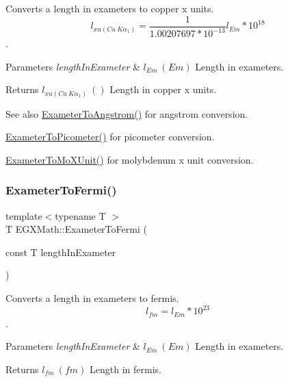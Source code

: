 Converts a length in exameters to copper x units. \[ l_{xu(Cu\ K\alpha_1)}= \frac{1}{1.00207697*10^{-13}} l_{Em} * 10^{18}\]. 


\begin{DoxyParams}{Parameters}
{\em length\+In\+Exameter} & $ l_{Em}\ (Em)$ Length in exameters. \\
\hline
\end{DoxyParams}
\begin{DoxyReturn}{Returns}
$ l_{xu(Cu\ K\alpha_1)}\ ()$ Length in copper x units. 
\end{DoxyReturn}
\begin{DoxySeeAlso}{See also}
\mbox{\hyperlink{group___e_g_x_math-_conversions-_length_conversions-_s_i-_exameter-_non-_s_i_ga24d2ee057470ce37f99d31451e010a22}{Exameter\+To\+Angstrom()}} for angstrom conversion. 

\mbox{\hyperlink{group___e_g_x_math-_conversions-_length_conversions-_s_i-_exameter-_s_i_gaf524e8324fedf2eb61d43ce1dc36bcac}{Exameter\+To\+Picometer()}} for picometer conversion. 

\mbox{\hyperlink{group___e_g_x_math-_conversions-_length_conversions-_s_i-_exameter-_non-_s_i_gadf73e46609660df6b7ae77ec7241183e}{Exameter\+To\+Mo\+X\+Unit()}} for molybdenum x unit conversion. 
\end{DoxySeeAlso}
\mbox{\label{group___e_g_x_math-_conversions-_length_conversions-_s_i-_exameter-_non-_s_i_ga0aa0524461cbce1fcc102b847545d212}} 
\subsubsection{\texorpdfstring{Exameter\+To\+Fermi()}{ExameterToFermi()}}
{\footnotesize\ttfamily template$<$typename T $>$ \\
T E\+G\+X\+Math\+::\+Exameter\+To\+Fermi (\begin{DoxyParamCaption}\item[{const T}]{length\+In\+Exameter }\end{DoxyParamCaption})}



Converts a length in exameters to fermis. \[ l_{fm}=l_{Em} * 10^{23} \]. 


\begin{DoxyParams}{Parameters}
{\em length\+In\+Exameter} & $ l_{Em}\ (Em)$ Length in exameters. \\
\hline
\end{DoxyParams}
\begin{DoxyReturn}{Returns}
$ l_{fm}\ (fm)$ Length in fermis. 
\end{DoxyReturn}
\mbox{\label{group___e_g_x_math-_conversions-_length_conversions-_s_i-_exameter-_non-_s_i_ga3356bb6585e02757a196b299c29660c1}} 
